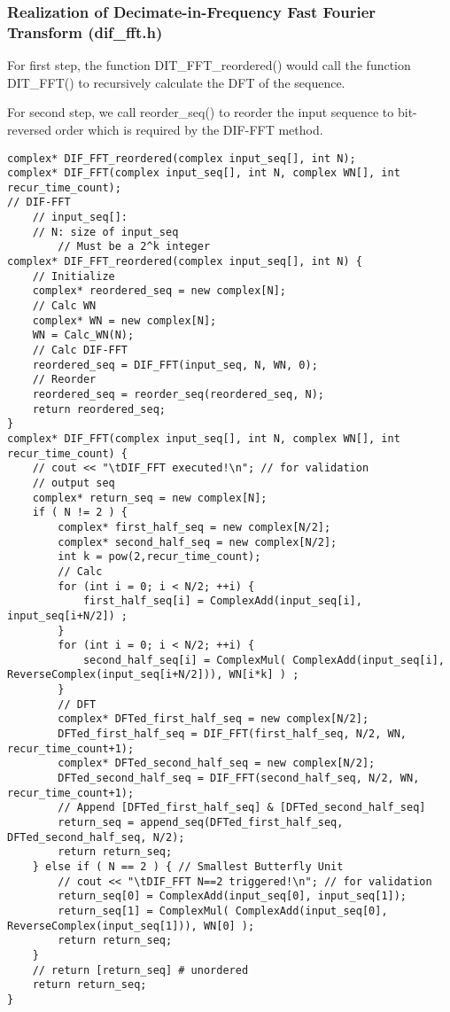 \documentclass[UTF8,a4paper]{ctexart}
\begin{document}
\newpage
\subsubsection{Realization of Decimate-in-Frequency Fast Fourier Transform (dif\_fft.h)}

	For first step, the function DIT\_FFT\_reordered() would call the function DIT\_FFT() to recursively calculate the DFT of the sequence.
	
	For second step, we call reorder\_seq() to reorder the input sequence to bit-reversed order which is required by the DIF-FFT method.


    \begin{lstlisting}
complex* DIF_FFT_reordered(complex input_seq[], int N);
complex* DIF_FFT(complex input_seq[], int N, complex WN[], int recur_time_count);
// DIF-FFT
	// input_seq[]: 
	// N: size of input_seq
		// Must be a 2^k integer
complex* DIF_FFT_reordered(complex input_seq[], int N) {
	// Initialize
	complex* reordered_seq = new complex[N];
	// Calc WN
	complex* WN = new complex[N];
	WN = Calc_WN(N);
	// Calc DIF-FFT
	reordered_seq = DIF_FFT(input_seq, N, WN, 0);
	// Reorder
	reordered_seq = reorder_seq(reordered_seq, N);
	return reordered_seq;
}
complex* DIF_FFT(complex input_seq[], int N, complex WN[], int recur_time_count) {
	// cout << "\tDIF_FFT executed!\n"; // for validation
	// output seq
	complex* return_seq = new complex[N];
	if ( N != 2 ) {
		complex* first_half_seq = new complex[N/2];
		complex* second_half_seq = new complex[N/2];
		int k = pow(2,recur_time_count);
		// Calc
		for (int i = 0; i < N/2; ++i) {
			first_half_seq[i] = ComplexAdd(input_seq[i], input_seq[i+N/2]) ;
		}
		for (int i = 0; i < N/2; ++i) {
			second_half_seq[i] = ComplexMul( ComplexAdd(input_seq[i], ReverseComplex(input_seq[i+N/2])), WN[i*k] ) ;
		}
		// DFT
		complex* DFTed_first_half_seq = new complex[N/2];
		DFTed_first_half_seq = DIF_FFT(first_half_seq, N/2, WN, recur_time_count+1);
		complex* DFTed_second_half_seq = new complex[N/2];
		DFTed_second_half_seq = DIF_FFT(second_half_seq, N/2, WN, recur_time_count+1);
		// Append [DFTed_first_half_seq] & [DFTed_second_half_seq]
		return_seq = append_seq(DFTed_first_half_seq, DFTed_second_half_seq, N/2);
		return return_seq;
	} else if ( N == 2 ) { // Smallest Butterfly Unit
		// cout << "\tDIF_FFT N==2 triggered!\n"; // for validation
		return_seq[0] = ComplexAdd(input_seq[0], input_seq[1]);
		return_seq[1] = ComplexMul( ComplexAdd(input_seq[0], ReverseComplex(input_seq[1])), WN[0] );
		return return_seq;
	}
	// return [return_seq] # unordered
	return return_seq;
}

    \end{lstlisting}
\end{document}
